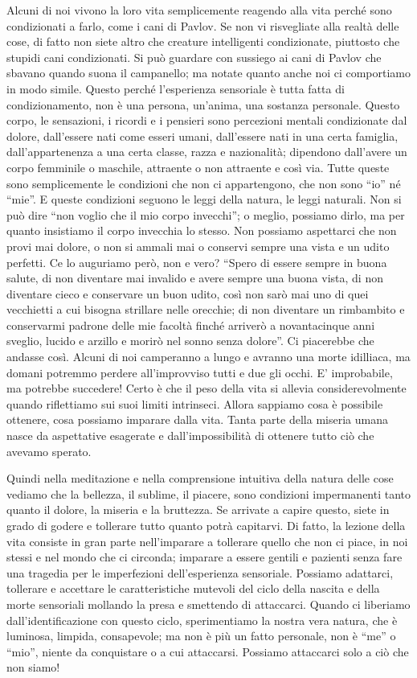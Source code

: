 Alcuni di noi vivono la loro vita semplicemente reagendo alla vita
perché sono condizionati a farlo, come i cani di Pavlov. Se non vi
risvegliate alla realtà delle cose, di fatto non siete altro che
creature intelligenti condizionate, piuttosto che stupidi cani
condizionati. Si può guardare con sussiego ai cani di Pavlov che sbavano
quando suona il campanello; ma notate quanto anche noi ci comportiamo in
modo simile. Questo perché l'esperienza sensoriale è tutta fatta di
condizionamento, non è una persona, un'anima, una sostanza personale.
Questo corpo, le sensazioni, i ricordi e i pensieri sono percezioni
mentali condizionate dal dolore, dall'essere nati come esseri umani,
dall'essere nati in una certa famiglia, dall'appartenenza a una certa
classe, razza e nazionalità; dipendono dall'avere un corpo femminile o
maschile, attraente o non attraente e così via. Tutte queste sono
semplicemente le condizioni che non ci appartengono, che non sono ``io''
né ``mie''. E queste condizioni seguono le leggi della natura, le leggi
naturali. Non si può dire ``non voglio che il mio corpo invecchi''; o
meglio, possiamo dirlo, ma per quanto insistiamo il corpo invecchia lo
stesso. Non possiamo aspettarci che non provi mai dolore, o non si
ammali mai o conservi sempre una vista e un udito perfetti. Ce lo
auguriamo però, non e vero? ``Spero di essere sempre in buona salute, di
non diventare mai invalido e avere sempre una buona vista, di non
diventare cieco e conservare un buon udito, così non sarò mai uno di
quei vecchietti a cui bisogna strillare nelle orecchie; di non diventare
un rimbambito e conservarmi padrone delle mie facoltà finché arriverò a
novantacinque anni sveglio, lucido e arzillo e morirò nel sonno senza
dolore''. Ci piacerebbe che andasse così. Alcuni di noi camperanno a
lungo e avranno una morte idilliaca, ma domani potremmo perdere
all'improvviso tutti e due gli occhi. E' improbabile, ma potrebbe
succedere! Certo è che il peso della vita si allevia considerevolmente
quando riflettiamo sui suoi limiti intrinseci. Allora sappiamo cosa è
possibile ottenere, cosa possiamo imparare dalla vita. Tanta parte della
miseria umana nasce da aspettative esagerate e dall'impossibilità di
ottenere tutto ciò che avevamo sperato.

Quindi nella meditazione e nella comprensione intuitiva della natura
delle cose vediamo che la bellezza, il sublime, il piacere, sono
condizioni impermanenti tanto quanto il dolore, la miseria e la
bruttezza. Se arrivate a capire questo, siete in grado di godere e
tollerare tutto quanto potrà capitarvi. Di fatto, la lezione della vita
consiste in gran parte nell'imparare a tollerare quello che non ci
piace, in noi stessi e nel mondo che ci circonda; imparare a essere
gentili e pazienti senza fare una tragedia per le imperfezioni
dell'esperienza sensoriale. Possiamo adattarci, tollerare e accettare le
caratteristiche mutevoli del ciclo della nascita e della morte
sensoriali mollando la presa e smettendo di attaccarci. Quando ci
liberiamo dall'identificazione con questo ciclo, sperimentiamo la nostra
vera natura, che è luminosa, limpida, consapevole; ma non è più un fatto
personale, non è ``me'' o ``mio'', niente da conquistare o a cui attaccarsi.
Possiamo attaccarci solo a ciò che non siamo!

